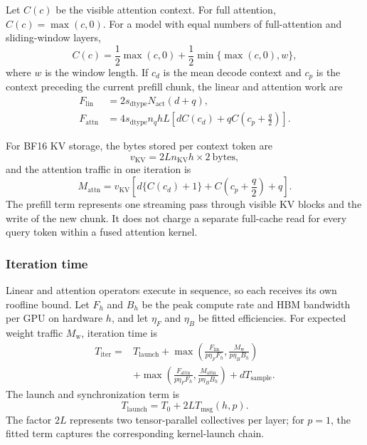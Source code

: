 Let $C(c)$ be the visible attention context.  For full attention,
$C(c)=\max(c,0)$.  For a model with equal numbers of full-attention and
sliding-window layers,
\begin{equation}
  C(c)=\frac{1}{2}\max(c,0)+
       \frac{1}{2}\min\{\max(c,0),w\},
  \label{eq:effective-context}
\end{equation}
where $w$ is the window length.  If $c_d$ is the mean decode context and $c_p$
is the context preceding the current prefill chunk, the linear and attention
work are
\begin{align}
  F_{\mathrm{lin}}
    &=2s_{\mathrm{dtype}}N_{\mathrm{act}}(d+q),\\
  F_{\mathrm{attn}}
    &=4s_{\mathrm{dtype}}n_qhL
      \left[dC(c_d)+qC\!\left(c_p+\frac{q}{2}\right)\right].
  \label{eq:iteration-flops}
\end{align}

For BF16 KV storage, the bytes stored per context token are
\begin{equation}
  v_{\mathrm{KV}}=2L n_{\mathrm{KV}}h\times2\ \mathrm{bytes},
  \label{eq:kv-bytes}
\end{equation}
and the attention traffic in one iteration is
\begin{equation}
  M_{\mathrm{attn}}=v_{\mathrm{KV}}
  \left[d\{C(c_d)+1\}+C\!\left(c_p+\frac{q}{2}\right)+q\right].
  \label{eq:attention-bytes}
\end{equation}
The prefill term represents one streaming pass through visible KV blocks and
the write of the new chunk.  It does not charge a separate full-cache read for
every query token within a fused attention kernel.

\subsubsection{Iteration time}

Linear and attention operators execute in sequence, so each receives its own
roofline bound.  Let $F_h$ and $B_h$ be the peak compute rate and HBM bandwidth
per GPU on hardware $h$, and let $\eta_F$ and $\eta_B$ be fitted efficiencies.
For expected weight traffic $M_{\mathrm{w}}$, iteration time is
\begin{align}
  T_{\mathrm{iter}}={}&T_{\mathrm{launch}}
  +\max\!\left(
    \frac{F_{\mathrm{lin}}}{p\eta_FF_h},
    \frac{M_{\mathrm{w}}}{p\eta_BB_h}
  \right) \nonumber\\
  &+\max\!\left(
    \frac{F_{\mathrm{attn}}}{p\eta_FF_h},
    \frac{M_{\mathrm{attn}}}{p\eta_BB_h}
  \right)+dT_{\mathrm{sample}}.
  \label{eq:iteration-time}
\end{align}
The launch and synchronization term is
\begin{equation}
  T_{\mathrm{launch}}=T_0+2L T_{\mathrm{msg}}(h,p).
  \label{eq:launch-time}
\end{equation}
The factor $2L$ represents two tensor-parallel collectives per layer; for
$p=1$, the fitted term captures the corresponding kernel-launch chain.

